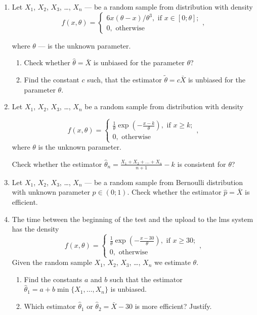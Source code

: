 \documentclass[12pt]{article}
\begin{document}
\begin{enumerate}

\item Let $X_1$, $X_2$, $X_3$, \ldots, $X_n$ — 
be a random sample from distribution with density
\[
f(x, \theta) = \begin{cases}
  6x(\theta - x)/\theta^3, \text{ if } x\in [0;\theta]; \\
  0, \text{ otherwise}
\end{cases},
\]

where $\theta$ — is the unknown parameter. 

\begin{enumerate}
\item Check whether $\hat\theta=\bar X$ is unbiased for the parameter $\theta$?
\item Find the constant $c$ such, 
that the estimator $\tilde \theta = c\bar X$ is unbiased for the parameter $\theta$. 
\end{enumerate}


\item Let $X_1$, $X_2$, $X_3$, \ldots, $X_n$ be a random sample from distribution with density

\[
  f(x, \theta) = \begin{cases}
    \frac{1}{\theta}\exp\left(-\frac{x-k}{\theta}\right), \text{ if } x\geq k; \\
    0, \text{ otherwise}
  \end{cases},    
\]
where $\theta$ is the unknown parameter.

Check whether the estimator $\hat\theta_n = \frac{X_1 + X_2 + \ldots + X_n}{n+1} - k$ is consistent for $\theta$?



\item  Let $X_1$, $X_2$, $X_3$, \ldots, $X_n$ — 
be a random sample from Bernoulli distribution with unknown parameter $p\in (0;1)$. 
Check whether the estimator $\hat p = \bar X$ is efficient.




\item  The time between the beginning of the test and the upload to the lms system
has the density
\[
  f(x, \theta) = \begin{cases}
    \frac{1}{\theta}\exp\left(-\frac{x-30}{\theta}\right), \text{ if } x\geq 30; \\
    0, \text{ otherwise}
  \end{cases},    
\]
Given the random sample $X_1$, $X_2$, $X_3$, \ldots, $X_n$ we estimate $\theta$. 

\begin{enumerate}
\item Find the constants  $a$ and $b$ such that the estimator  $\hat \theta_1 = a + b\min\{X_1, \ldots, X_n\}$ is unbiased.
\item Which estimator $\hat \theta_1$ or $\hat \theta_2 = \bar X - 30$ is more efficient? Justify.
\end{enumerate}

\end{enumerate}
\end{document}
